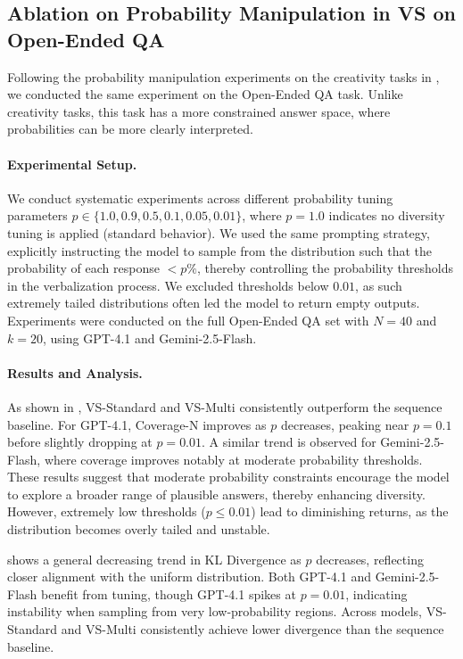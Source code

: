 \newpage
\subsection{Ablation on Probability Manipulation in VS on Open-Ended QA} \label{sec:diversity_tuning_open_ended_qa}
Following the probability manipulation experiments on the creativity tasks in , we conducted the same experiment on the Open-Ended QA task. Unlike creativity tasks, this task has a more constrained answer space, where probabilities can be more clearly interpreted. 

\paragraph{Experimental Setup.} We conduct systematic experiments across different probability tuning parameters $p \in \{1.0, 0.9, 0.5, 0.1, 0.05, 0.01\}$, where $p = 1.0$ indicates no diversity tuning is applied (standard \ours behavior). 
We used the same prompting strategy, explicitly instructing the model to sample from the distribution such that the probability of each response $< p\%$, thereby controlling the probability thresholds in the verbalization process. 
We excluded thresholds below $0.01$, as such extremely tailed distributions often led the model to return empty outputs.
Experiments were conducted on the full Open-Ended QA set with $N=40$ and $k=20$, using GPT-4.1 and Gemini-2.5-Flash.

\paragraph{Results and Analysis.} As shown in , VS-Standard and VS-Multi consistently outperform the sequence baseline. For GPT-4.1, Coverage-N improves as $p$ decreases, peaking near $p=0.1$ before slightly dropping at $p=0.01$. A similar trend is observed for Gemini-2.5-Flash, where coverage improves notably at moderate probability thresholds. These results suggest that moderate probability constraints encourage the model to explore a broader range of plausible answers, thereby enhancing diversity. However, extremely low thresholds ($p \leq 0.01$) lead to diminishing returns, as the distribution becomes overly tailed and unstable.

 shows a general decreasing trend in KL Divergence as $p$ decreases, reflecting closer alignment with the uniform distribution. Both GPT-4.1 and Gemini-2.5-Flash benefit from tuning, though GPT-4.1 spikes at $p=0.01$, indicating instability when sampling from very low-probability regions. Across models, VS-Standard and VS-Multi consistently achieve lower divergence than the sequence baseline.

